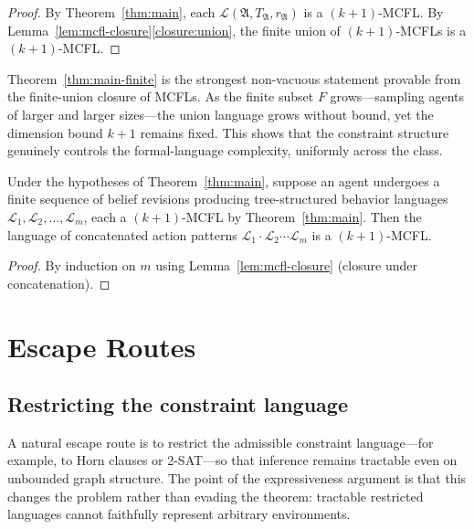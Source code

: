 \documentclass[runningheads]{llncs}
\begin{document}
\begin{proof}
By Theorem~\ref{thm:main}, each $\mathcal{L}(\mathfrak{A}, T_{\mathfrak{A}}, r_{\mathfrak{A}})$ is a $(k{+}1)$-MCFL.
By Lemma~\ref{lem:mcfl-closure}\ref{closure:union}, the finite union of $(k{+}1)$-MCFLs is a $(k{+}1)$-MCFL.
\end{proof}

\begin{remark}\label{rem:finite-subclass}
Theorem~\ref{thm:main-finite} is the strongest non-vacuous statement provable from the finite-union closure of MCFLs.
As the finite subset $F$ grows---sampling agents of larger and larger sizes---the union language grows without bound, yet the dimension bound $k+1$ remains fixed.
This shows that the constraint structure genuinely controls the formal-language complexity, uniformly across the class.
\end{remark}

\begin{corollary}\label{cor:temporal}
Under the hypotheses of Theorem~\ref{thm:main}, suppose an agent undergoes a finite sequence of belief revisions producing tree-structured behavior languages $\mathcal{L}_1, \mathcal{L}_2, \ldots, \mathcal{L}_m$, each a $(k{+}1)$-MCFL by Theorem~\ref{thm:main}.
Then the language of concatenated action patterns $\mathcal{L}_1 \cdot \mathcal{L}_2 \cdots \mathcal{L}_m$ is a $(k{+}1)$-MCFL.
\end{corollary}

\begin{proof}
By induction on $m$ using Lemma~\ref{lem:mcfl-closure} (closure under concatenation).
\end{proof}

\section{Escape Routes}\label{sec:escape}

\subsection{Restricting the constraint language}\label{sec:expressiveness}\label{sec:restricted}

A natural escape route is to restrict the admissible constraint language---for example, to Horn clauses or 2-SAT---so that inference remains tractable even on unbounded graph structure. The point of the expressiveness argument is that this changes the problem rather than evading the theorem: tractable restricted languages cannot faithfully represent arbitrary environments.
\end{document}
